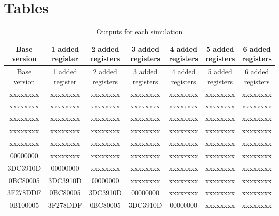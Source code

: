 \documentclass[a4paper, titlepage]{article}
\begin{document}
\section{Tables}
\begin{longtable}{*7c}
\caption{Outputs for each simulation}
\label{tab:output simulations}\\
\toprule
 \thead{Base\\version} & \thead{1 added\\register} & \thead{2 added\\registers} & \thead{3 added\\registers} & \thead{4 added\\registers} & \thead{5 added\\registers}  & \thead{6 added\\registers}\\
\midrule
\endfirsthead
 \thead{Base\\version} & \thead{1 added\\register} & \thead{2 added\\registers} & \thead{3 added\\registers} & \thead{4 added\\registers} & \thead{5 added\\registers}  & \thead{6 added\\registers}\\
\midrule
\endhead
\midrule
\endfoot
\bottomrule
\endlastfoot
xxxxxxxx & xxxxxxxx & xxxxxxxx & xxxxxxxx & xxxxxxxx & xxxxxxxx & xxxxxxxx\\
xxxxxxxx & xxxxxxxx & xxxxxxxx & xxxxxxxx & xxxxxxxx & xxxxxxxx & xxxxxxxx\\
xxxxxxxx & xxxxxxxx & xxxxxxxx & xxxxxxxx & xxxxxxxx & xxxxxxxx & xxxxxxxx\\
xxxxxxxx & xxxxxxxx & xxxxxxxx & xxxxxxxx & xxxxxxxx & xxxxxxxx & xxxxxxxx\\
xxxxxxxx & xxxxxxxx & xxxxxxxx & xxxxxxxx & xxxxxxxx & xxxxxxxx & xxxxxxxx\\
00000000 & xxxxxxxx & xxxxxxxx & xxxxxxxx & xxxxxxxx & xxxxxxxx & xxxxxxxx\\
3DC3910D & 00000000 & xxxxxxxx & xxxxxxxx & xxxxxxxx & xxxxxxxx & xxxxxxxx\\
0BC80005 & 3DC3910D & 00000000 & xxxxxxxx & xxxxxxxx & xxxxxxxx & xxxxxxxx\\
3F278DDF & 0BC80005 & 3DC3910D & 00000000 & xxxxxxxx & xxxxxxxx & xxxxxxxx\\
0B100005 & 3F278DDF & 0BC80005 & 3DC3910D & 00000000 & xxxxxxxx & xxxxxxxx\\

\end{longtable}
\end{document}
